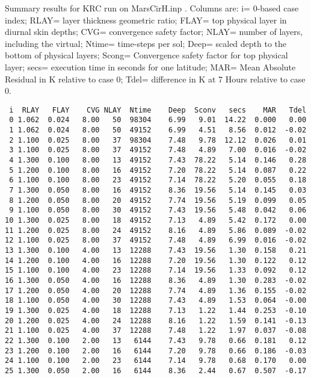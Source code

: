 \documentclass{article}
\begin{document}
\begin{table} \caption[KRC run H]{Summary results for KRC run on MarsCirH.inp . 
Columns are: i= 0-based case index; RLAY= layer thickness geometric ratio; FLAY=
top physical layer in diurnal skin depths; CVG= convergence safety factor; NLAY=
number of layers, including the virtual; Ntime= time-steps per sol; Deep= scaled
depth to the bottom of physical layers; Scong= Convergence safety factor for top
physical layer; secs= execution time in seconds for one latitude; MAR= Mean
Absolute Residual in K relative to case 0; Tdel= difference in K at 7 Hours
relative to case 0.}
\label{runH}
\begin{verbatim}
 i  RLAY   FLAY    CVG NLAY  Ntime    Deep  Sconv   secs    MAR   Tdel
 0 1.062  0.024   8.00   50  98304    6.99   9.01  14.22  0.000   0.00
 1 1.062  0.024   8.00   50  49152    6.99   4.51   8.56  0.012  -0.02
 2 1.100  0.025   8.00   37  98304    7.48   9.78  12.12  0.026   0.01
 3 1.100  0.025   8.00   37  49152    7.48   4.89   7.00  0.016  -0.02
 4 1.300  0.100   8.00   13  49152    7.43  78.22   5.14  0.146   0.28
 5 1.200  0.100   8.00   16  49152    7.20  78.22   5.14  0.087   0.22
 6 1.100  0.100   8.00   23  49152    7.14  78.22   5.20  0.055   0.18
 7 1.300  0.050   8.00   16  49152    8.36  19.56   5.14  0.145   0.03
 8 1.200  0.050   8.00   20  49152    7.74  19.56   5.19  0.099   0.05
 9 1.100  0.050   8.00   30  49152    7.43  19.56   5.48  0.042   0.06
10 1.300  0.025   8.00   18  49152    7.13   4.89   5.42  0.172   0.00
11 1.200  0.025   8.00   24  49152    8.16   4.89   5.86  0.089  -0.02
12 1.100  0.025   8.00   37  49152    7.48   4.89   6.99  0.016  -0.02
13 1.300  0.100   4.00   13  12288    7.43  19.56   1.30  0.158   0.21
14 1.200  0.100   4.00   16  12288    7.20  19.56   1.30  0.122   0.12
15 1.100  0.100   4.00   23  12288    7.14  19.56   1.33  0.092   0.12
16 1.300  0.050   4.00   16  12288    8.36   4.89   1.30  0.283  -0.02
17 1.200  0.050   4.00   20  12288    7.74   4.89   1.36  0.155  -0.02
18 1.100  0.050   4.00   30  12288    7.43   4.89   1.53  0.064  -0.00
19 1.300  0.025   4.00   18  12288    7.13   1.22   1.44  0.253  -0.10
20 1.200  0.025   4.00   24  12288    8.16   1.22   1.59  0.141  -0.13
21 1.100  0.025   4.00   37  12288    7.48   1.22   1.97  0.037  -0.08
22 1.300  0.100   2.00   13   6144    7.43   9.78   0.66  0.181   0.12
23 1.200  0.100   2.00   16   6144    7.20   9.78   0.66  0.186  -0.03
24 1.100  0.100   2.00   23   6144    7.14   9.78   0.68  0.170   0.00
25 1.300  0.050   2.00   16   6144    8.36   2.44   0.67  0.507  -0.17

\end{verbatim}
\end{table}
\end{document}
